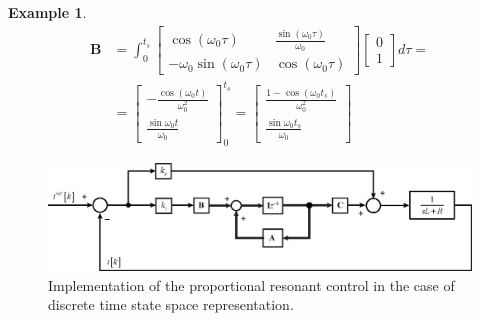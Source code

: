 \documentclass[11pt,a4paper,oneside]{book}
\numberwithin{equation}{section}
\theoremstyle{it}
\theoremstyle{definition}
\newtheorem{example}{Example}[chapter]
\begin{document}
\begin{example}
	\begin{equation}
		\begin{aligned}
			\mathbf{B} &=\int_{0}^{t_s}{
				\begin{bmatrix}
					\cos(\omega_0\tau) & \frac{\sin(\omega_0\tau)}{\omega_0} \\[6pt]
					-\omega_0 \sin(\omega_0\tau) & \cos(\omega_0\tau)
				\end{bmatrix}\begin{bmatrix}
					0 \\
					1
				\end{bmatrix}d\tau} = \\[12pt]
			&=\begin{bmatrix} -\frac{\cos(\omega_0t)}{\omega_0^2} \\[6pt]
				\frac{\sin{\omega_0t}}{\omega_0} \end{bmatrix}_0^{t_s} = 
			\begin{bmatrix} \frac{1-\cos(\omega_0t_s)}{\omega_0^2} \\[6pt]
				\frac{\sin{\omega_0t_s}}{\omega_0} \end{bmatrix}
		\end{aligned}
	\end{equation}
	
	\begin{figure}[H]
		\centering
		\includegraphics[width = 440pt, keepaspectratio] 
		{figures/PRcontrollerSS_2.eps}
		\captionsetup{width=0.5\textwidth, font=small}		
		\caption{Implementation of the proportional resonant control in the case of discrete time state space representation.}
		\label{figure_ctrlss}
	\end{figure}


\end{example}
\end{document}

